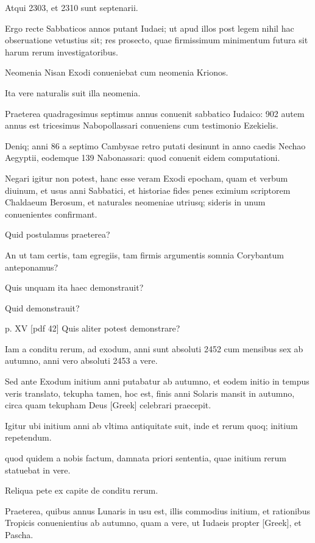 \begin{parnumbers}
Atqui 2303, et 2310 sunt septenarii.

Ergo recte
Sabbaticos annos putant Iudaei; ut apud illos post legem nihil
hac obseruatione vetustius sit; res prosecto, quae firmissimum
minimentum futura sit harum rerum investigatoribus.

Neomenia Nisan Exodi conueniebat cum neomenia Krionos.

Ita vere naturalis suit illa neomenia.

Praeterea quadragesimus septimus
annus conuenit sabbatico Iudaico: 902 autem annus est tricesimus
Nabopollassari conueniens cum testimonio Ezekielis.

Deniq; anni 86 a septimo Cambysae retro putati desinunt in anno
caedis Nechao Aegyptii, eodemque 139 Nabonassari: quod conuenit
eidem computationi.

Negari igitur non potest, hanc esse veram
Exodi epocham, quam et verbum diuinum, et usus anni Sabbatici,
et historiae fides penes eximium scriptorem Chaldaeum
Berosum, et naturales neomeniae utriusq; sideris in unum conuenientes
confirmant.

Quid postulamus praeterea?

An ut tam certis,
tam egregiis, tam firmis argumentis somnia Corybantum anteponamus?

Quis unquam ita haec demonstrauit?

Quid demonstrauit?

\clearpage
p. XV [pdf 42]
Quis aliter potest demonstrare?

Iam a conditu rerum, ad exodum,
anni sunt absoluti 2452 cum mensibus sex ab autumno, anni vero
absoluti 2453 a vere.

Sed ante Exodum initium anni putabatur ab
autumno, et eodem initio in tempus veris translato, tekupha tamen,
hoc est, finis anni Solaris mansit in autumno, circa quam tekupham
Deus \textgreek{[Greek]} celebrari praecepit.

Igitur ubi initium anni
ab vltima antiquitate suit, inde et rerum quoq; initium repetendum.

quod quidem a nobis factum, damnata priori sententia, quae
initium rerum statuebat in vere.

Reliqua pete ex capite de conditu
rerum.

Praeterea, quibus annus Lunaris in usu est, illis commodius
initium, et rationibus Tropicis conuenientius ab autumno, quam
a vere, ut Iudaeis propter \textgreek{[Greek]}, et Pascha.


\end{parnumbers}
